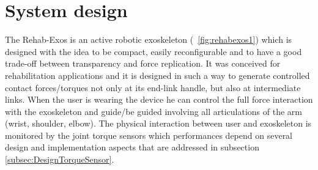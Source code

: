 \documentclass[journal]{IEEEtran}
\newcommand{\hldone}[1]{\colorbox{green}{#1}}
\begin{document}

\section{System design} \label{sec:systemDesign}
The Rehab-Exos is an active robotic exoskeleton (\figurename \ \ref{fig:rehabexos1}) which is designed with the idea to be compact, easily reconfigurable and to have a good trade-off between transparency and force replication.
It was conceived for rehabilitation applications and it is designed in such a way to generate controlled contact forces/torques not only at its end-link handle, but also at  intermediate links. When the user is wearing the device he can control the full force interaction with the exoskeleton and guide/be guided involving all articulations of the arm (wrist, shoulder, elbow). 
The physical interaction between user and exoskeleton is monitored by the joint torque sensors which performances depend on several design and implementation aspects that are addressed in subsection \ref{subsec:DesignTorqueSensor}.
\end{document}
